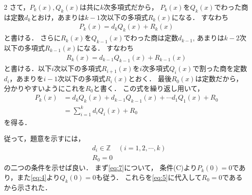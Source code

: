 \documentclass[../../main.tex]{subfiles}
\begin{document}
\begin{multicols}{2}
  さて，$P_k(x), Q_k(x)$は共に$k$次多項式だから，
  $P_k(x)$を$Q_k(x)$でわった商は定数$d_k$とおけ，あまりは$k-1$次以下の多項式$R_k(x)$になる．
  すなわち
  \begin{align}
    P_{k}(x) = d_k Q_k(x) + R_{k}(x)
  \end{align}
  と書ける．
  さらに$R_{k}(x)$を$Q_{k-1}(x)$でわった商は定数$d_{k-1}$, あまりは$k-2$次以下の多項式$R_{k-1}(x)$になる．
  すなわち
  \begin{align}
    R_{k}(x) = d_{k-1} Q_{k-1}(x) + R_{k-1}(x)
  \end{align}
  と書ける．以下$i$次以下の多項式$R_{i+1}(x)$を$i$次多項式$Q_{i}(x)$で割った商を定数$d_{i}$，あまりを$i-1$次以下の多項式$R_{i}(x)$とおく．
  最後$R_{0}(x)$は定数だから，分かりやすいようにこれを$R_{0}$と書く．
  この式を繰り返し用いて，
  \begin{align}
    P_{k}(x)
    & = d_{k}Q_{k}(x) + d_{k-1}Q_{k-1}(x) + \cdots d_{1}Q_{1}(x) + R_{0} \\
    & = \sum_{i=1}^k d_i Q_i(x) + R_{0} \label{eq:5}
  \end{align}
  を得る．

  従って，題意を示すには，
  \begin{align}
    & d_{i} \in \mathbb{Z}           & (i=1,2,\cdots, k) \label{eq:6} \\
    & R_{0} = 0  \label{eq:7}
  \end{align}
  の二つの条件を示せば良い．
  まず\cref{eq:7}について，
  条件(C)より$P_{k}(0)=0$であり，また\cref{eq:4}より$Q_{k}(0)=0$も従う．
  これらを\cref{eq:5}に代入して$R_{0}=0$であるから示された．


\end{multicols}
\end{document}

